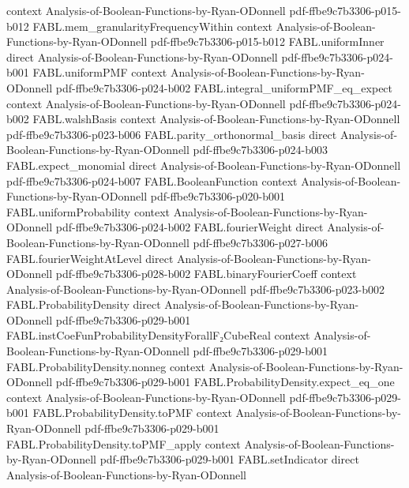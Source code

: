 \begin{theorem}
  {context}
  {Analysis-of-Boolean-Functions-by-Ryan-ODonnell}
  {pdf-ffbe9c7b3306-p015-b012}
\proofstep
  {FABL.mem_granularityFrequencyWithin}
  {context}
  {Analysis-of-Boolean-Functions-by-Ryan-ODonnell}
  {pdf-ffbe9c7b3306-p015-b012}
\proofstep
  {FABL.uniformInner}
  {direct}
  {Analysis-of-Boolean-Functions-by-Ryan-ODonnell}
  {pdf-ffbe9c7b3306-p024-b001}
\proofstep
  {FABL.uniformPMF}
  {context}
  {Analysis-of-Boolean-Functions-by-Ryan-ODonnell}
  {pdf-ffbe9c7b3306-p024-b002}
\proofstep
  {FABL.integral_uniformPMF_eq_expect}
  {context}
  {Analysis-of-Boolean-Functions-by-Ryan-ODonnell}
  {pdf-ffbe9c7b3306-p024-b002}
\proofstep
  {FABL.walshBasis}
  {context}
  {Analysis-of-Boolean-Functions-by-Ryan-ODonnell}
  {pdf-ffbe9c7b3306-p023-b006}
\proofstep
  {FABL.parity_orthonormal_basis}
  {direct}
  {Analysis-of-Boolean-Functions-by-Ryan-ODonnell}
  {pdf-ffbe9c7b3306-p024-b003}
\proofstep
  {FABL.expect_monomial}
  {direct}
  {Analysis-of-Boolean-Functions-by-Ryan-ODonnell}
  {pdf-ffbe9c7b3306-p024-b007}
\proofstep
  {FABL.BooleanFunction}
  {context}
  {Analysis-of-Boolean-Functions-by-Ryan-ODonnell}
  {pdf-ffbe9c7b3306-p020-b001}
\proofstep
  {FABL.uniformProbability}
  {context}
  {Analysis-of-Boolean-Functions-by-Ryan-ODonnell}
  {pdf-ffbe9c7b3306-p024-b002}
\proofstep
  {FABL.fourierWeight}
  {direct}
  {Analysis-of-Boolean-Functions-by-Ryan-ODonnell}
  {pdf-ffbe9c7b3306-p027-b006}
\proofstep
  {FABL.fourierWeightAtLevel}
  {direct}
  {Analysis-of-Boolean-Functions-by-Ryan-ODonnell}
  {pdf-ffbe9c7b3306-p028-b002}
\proofstep
  {FABL.binaryFourierCoeff}
  {context}
  {Analysis-of-Boolean-Functions-by-Ryan-ODonnell}
  {pdf-ffbe9c7b3306-p023-b002}
\proofstep
  {FABL.ProbabilityDensity}
  {direct}
  {Analysis-of-Boolean-Functions-by-Ryan-ODonnell}
  {pdf-ffbe9c7b3306-p029-b001}
\proofstep
  {FABL.instCoeFunProbabilityDensityForallF₂CubeReal}
  {context}
  {Analysis-of-Boolean-Functions-by-Ryan-ODonnell}
  {pdf-ffbe9c7b3306-p029-b001}
\proofstep
  {FABL.ProbabilityDensity.nonneg}
  {context}
  {Analysis-of-Boolean-Functions-by-Ryan-ODonnell}
  {pdf-ffbe9c7b3306-p029-b001}
\proofstep
  {FABL.ProbabilityDensity.expect_eq_one}
  {context}
  {Analysis-of-Boolean-Functions-by-Ryan-ODonnell}
  {pdf-ffbe9c7b3306-p029-b001}
\proofstep
  {FABL.ProbabilityDensity.toPMF}
  {context}
  {Analysis-of-Boolean-Functions-by-Ryan-ODonnell}
  {pdf-ffbe9c7b3306-p029-b001}
\proofstep
  {FABL.ProbabilityDensity.toPMF_apply}
  {context}
  {Analysis-of-Boolean-Functions-by-Ryan-ODonnell}
  {pdf-ffbe9c7b3306-p029-b001}
\proofstep
  {FABL.setIndicator}
  {direct}
  {Analysis-of-Boolean-Functions-by-Ryan-ODonnell}

\end{theorem}
